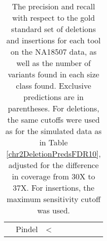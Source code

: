 \begin{table}
\begin{center}
\begin{tabular}{r|rrr|rrrrr}
&  Pindel & <%
\hline
\end{tabular}
\end{center}
\caption{The precision and recall with respect to the gold standard set of deletions and insertions for each tool on the NA18507 data, as well as the number of variants found in each size class found. Exclusive predictions are in parentheses. For deletions, the same cutoffs were used as for the simulated data as in Table \ref{chr2DeletionPredsFDR10}, adjusted for the difference in coverage from 30X to 37X. For insertions, the maximum sensitivity cutoff was used.}
\label{NA18507DeletionAndInsertionPreds}
\end{table}

